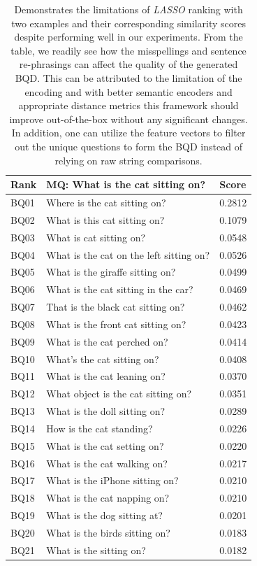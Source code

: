 \documentclass[letterpaper]{article}
\newcommand{\lasso}{}\def\lasso/{\textit{LASSO}}
\begin{document}
\begin{table}
\begin{subtable}{0.49\linewidth}
		\begin{tabular}{l|l|l}
			Rank & MQ: What is the cat sitting on?         & Score  \\
			\hline
			BQ01 & Where is the cat sitting on?            & 0.2812 \\
			BQ02 & What is this cat sitting on?            & 0.1079 \\
			BQ03 & What is cat sitting on?                 & 0.0548 \\
			BQ04 & What is the cat on the left sitting on? & 0.0526 \\
			BQ05 & What is the giraffe sitting on?         & 0.0499 \\
			BQ06 & What is the cat sitting in the car?     & 0.0469 \\
			BQ07 & That is the black cat sitting on?       & 0.0462 \\
			BQ08 & What is the front cat sitting on?       & 0.0423 \\
			BQ09 & What is the cat perched on?             & 0.0414 \\
			BQ10 & What's the cat sitting on?              & 0.0408 \\
			BQ11 & What is the cat leaning on?             & 0.0370 \\
			BQ12 & What object is the cat sitting on?      & 0.0351 \\
			BQ13 & What is the doll sitting on?            & 0.0289 \\
			BQ14 & How is the cat standing?                & 0.0226 \\
			BQ15 & What is the cat setting on?             & 0.0220 \\
			BQ16 & What is the cat walking on?             & 0.0217 \\
			BQ17 & What is the iPhone sitting on?          & 0.0210 \\
			BQ18 & What is the cat napping on?             & 0.0210 \\
			BQ19 & What is the dog sitting at?             & 0.0201 \\
			BQ20 & What is the birds sitting on?           & 0.0183 \\
			BQ21 & What is the sitting on?                 & 0.0182 \\
		\end{tabular}
	\end{subtable}
	\caption{Demonstrates the limitations of \lasso/ ranking with two examples and their corresponding similarity scores despite performing well in our experiments. From the table, we readily see how the misspellings and sentence re-phrasings can affect the quality of the generated BQD. This can be attributed to the limitation of the encoding and with better semantic encoders and appropriate distance metrics this framework should improve out-of-the-box without any significant changes. In addition, one can utilize the feature vectors to filter out the unique questions to form the BQD instead of relying on raw string comparisons.}
	\label{tbl:lasso_examples}
\end{table}
\end{document}
